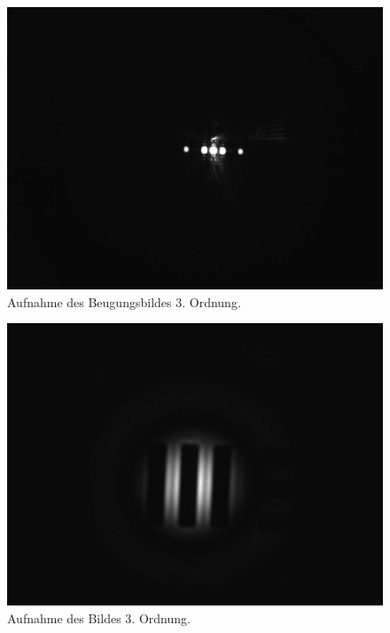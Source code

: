 \documentclass{article}
\begin{document}
\begin{minipage}[t]{.45\textwidth}
\begin{figure}[H]
\includegraphics[scale=0.1]{tm/Beugungsbild_3.jpg}
\caption{Aufnahme des Beugungsbildes 3. Ordnung.}
\label{fig:bbild_3_tm}
\end{figure}
\end{minipage}
\hfill
\noindent
\begin{minipage}[t]{.45\textwidth}
\begin{figure}[H]
\includegraphics[scale=0.1]{tm/Bild_3.jpg}
\caption{Aufnahme des Bildes 3. Ordnung.}
\label{fig:bild_3_tm}
\end{figure}
\end{minipage}
\end{document}
